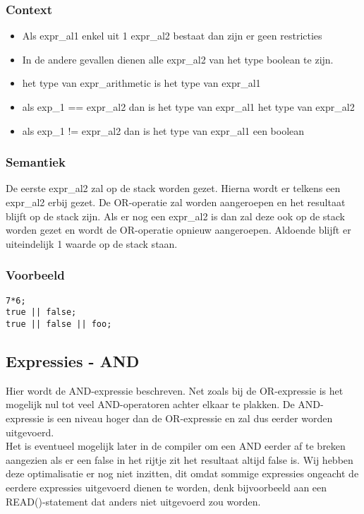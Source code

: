 \documentclass[]{article}
\begin{document}
\subsubsection{Context}
\begin{itemize}
\item Als expr\_al1 enkel uit 1 expr\_al2 bestaat dan zijn er geen restricties
\item In de andere gevallen dienen alle expr\_al2 van het type boolean te zijn.
\item het type van expr\_arithmetic is het type van expr\_al1
\item als exp\_1 == expr\_al2 dan is het type van expr\_al1 het type van expr\_al2
\item als exp\_1 != expr\_al2 dan is het type van expr\_al1 een boolean
\end{itemize}
\subsubsection{Semantiek}
De eerste expr\_al2 zal op de stack worden gezet. Hierna wordt er telkens een expr\_al2 erbij gezet. De OR-operatie zal worden aangeroepen en het resultaat blijft op de stack zijn. Als er nog een expr\_al2 is dan zal deze ook op de stack worden gezet en wordt de OR-operatie opnieuw aangeroepen. Aldoende blijft er uiteindelijk 1 waarde op de stack staan.
\subsubsection{Voorbeeld}
\begin{lstlisting}[style=SELMA]
7*6;
true || false;
true || false || foo;
\end{lstlisting}

\subsection{Expressies - AND}
Hier wordt de AND-expressie beschreven. Net zoals bij de OR-expressie is het mogelijk nul tot veel AND-operatoren achter elkaar te plakken. De AND-expressie is een niveau hoger dan de OR-expressie en zal dus eerder worden uitgevoerd. \\
Het is eventueel mogelijk later in de compiler om een AND eerder af te breken aangezien als er een false in het rijtje zit het resultaat altijd false is. Wij hebben deze optimalisatie er nog niet inzitten, dit omdat sommige expressies ongeacht de eerdere expressies uitgevoerd dienen te worden, denk bijvoorbeeld aan een READ()-statement dat anders niet uitgevoerd zou worden.
\end{document}
